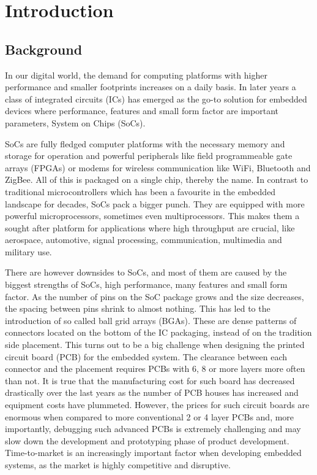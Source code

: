 \section{Introduction}

\subsection{Background}

In our digital world, the demand for computing platforms with higher performance and smaller footprints increases on a daily basis. In later years a class of integrated circuits (ICs) has emerged as the go-to solution for embedded devices where performance, features and small form factor are important parameters, System on Chips (SoCs).

SoCs are fully fledged computer platforms with the necessary memory and storage for operation and powerful peripherals like field programmeable gate arrays (FPGAs) or modems for wireless communication like WiFi, Bluetooth and ZigBee. All of this is packaged on a single chip, thereby the name. In contrast to traditional microcontrollers which has been a favourite in the embedded landscape for decades, SoCs pack a bigger punch. They are equipped with more powerful microprocessors, sometimes even multiprocessors. This makes them a sought after platform for applications where high throughput are crucial, like aerospace, automotive, signal processing, communication, multimedia and military use.

There are however downsides to SoCs, and most of them are caused by the biggest strengths of SoCs, high performance, many features and small form factor. As the number of pins on the SoC package grows and the size decreases, the spacing between pins shrink to almost nothing. This has led to the introduction of so called ball grid arrays (BGAs). These are dense patterns of connectors located on the bottom of the IC packaging, instead of on the tradition side placement. This turns out to be a big challenge when designing the printed circuit board (PCB) for the embedded system. The clearance between each connector and the placement requires PCBs with 6, 8 or more layers more often than not. It is true that the manufacturing cost for such board has decreased drastically over the last years as the number of PCB houses has increased and equipment costs have plummeted. However, the prices for such circuit boards are enormous when compared to more conventional 2 or 4 layer PCBs and, more importantly, debugging such advanced PCBs is extremely challenging and may slow down the development and prototyping phase of product development. Time-to-market is an increasingly important factor when developing embedded systems, as the market is highly competitive and disruptive. 

